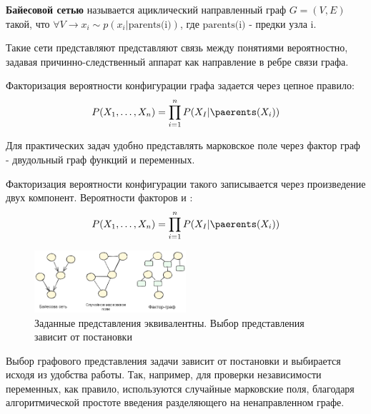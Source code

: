  \textbf{Байесовой сетью} называется ациклический направленный граф $G=(V,E)$ такой, что  
$\forall V \rightarrow x_i \sim p(x_i| \text{parents(i)})$, где $\text{parents(i)}$ - предки узла i.

Такие сети представляют представляют связь между понятиями вероятностно, 
задавая причинно-следственный аппарат как направление в ребре связи графа. 

Факторизация вероятности конфигурации графа задается через цепное правило:
\begin{equation}
    P(X_1, \dots, X_n) = \prod_{i=1}^n P(X_I | \paerents(X_i))
\end{equation}

Для практических задач удобно представлять марковское поле через фактор граф  - двудольный граф
функций и переменных. 

Факторизация вероятности конфигурации такого записывается через произведение двух компонент. Вероятности факторов и :
\begin{equation}
    P(X_1, \dots, X_n) = \prod_{i=1}^n P(X_I | \paerents(X_i))
\end{equation}


\begin{figure}[h]
    \centering
    \includegraphics[width=0.5\textwidth]{assets/math/discrete/equivavalence.excalidraw.png}
    \caption{Заданные представления эквивалентны. Выбор представления зависит от постановки}
    \label{factor_graph}
\end{figure}






Выбор графового представления задачи зависит от постановки и выбирается исходя из удобства работы. Так, например, для проверки
независимости переменных, как правило, используются случайные марковские поля, благодаря алгоритмической простоте введения 
разделяющего на ненаправленном графе. 








